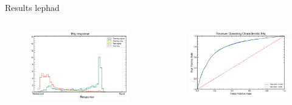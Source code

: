 \begin{frame}{Results lephad}
\begin{columns}
  \begin{column}{0.5\textwidth}
    \begin{figure}
      \includegraphics[width=\textwidth]{response_lephad.png}
    \end{figure}
  \end{column}
  \begin{column}{0.5\textwidth}
    \begin{figure}
      \includegraphics[width=\textwidth]{ROC_lephad.png}
    \end{figure}
  \end{column}
\end{columns}
\end{frame}